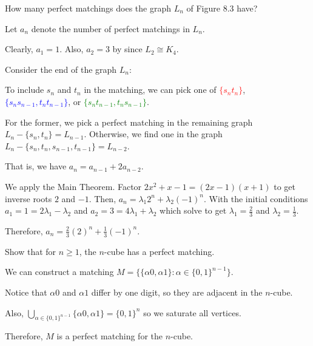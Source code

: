 \begin{xca}
  How many perfect matchings does the graph $L_n$ of Figure 8.3 have?
\end{xca}
\begin{sol}
  Let $a_n$ denote the number of perfect matchings in $L_n$.

  Clearly, $a_1 = 1$. Also, $a_2 = 3$ by  since $L_2 \cong K_4$.

  Consider the end of the graph $L_n$:
  \begin{center}
  \end{center}
  To include $s_n$ and $t_n$ in the matching, we can pick one of
  \textcolor{red}{$\{s_nt_n\}$},
  \textcolor{blue}{$\{s_ns_{n-1}, t_nt_{n-1}\}$}, or
  \textcolor{Green}{$\{s_nt_{n-1},t_ns_{n-1}\}$}.

  For the former, we pick a perfect matching in the remaining graph
  $L_n - \{s_n, t_n\} = L_{n-1}$.
  Otherwise, we find one in the graph $L_n - \{s_n,t_n,s_{n-1},t_{n-1}\} = L_{n-2}$.

  That is, we have $a_n = a_{n-1} + 2a_{n-2}$.

  We apply the Main Theorem.
  Factor $2x^2 + x - 1 = (2x-1)(x+1)$ to get inverse roots $2$ and $-1$.
  Then, $a_n = \lambda_1 2^n + \lambda_2 (-1)^n$.
  With the initial conditions $a_1 = 1 = 2\lambda_1 - \lambda_2$
  and $a_2 = 3 = 4\lambda_1 + \lambda_2$
  which solve to get $\lambda_1 = \frac23$ and $\lambda_2 = \frac13$.

  Therefore, $a_n = \frac23(2)^n + \frac13(-1)^n$.
\end{sol}

\begin{xca}
  Show that for $n \geq 1$, the $n$-cube has a perfect matching.
\end{xca}
\begin{sol}
  We can construct a matching $M = \{ \{ \alpha0,\alpha1 \} : \alpha \in \{0,1\}^{n-1} \}$.

  Notice that $\alpha0$ and $\alpha1$ differ by one digit,
  so they are adjacent in the $n$-cube.

  Also, $\bigcup_{\alpha \in \{0,1\}^{n-1}}\{\alpha0,\alpha1\} = \{0,1\}^n$
  so we saturate all vertices.

  Therefore, $M$ is a perfect matching for the $n$-cube.
\end{sol}

